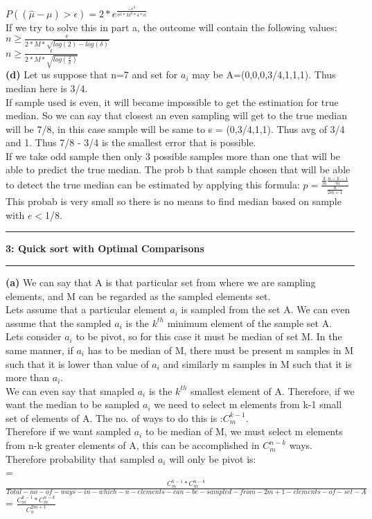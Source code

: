 \documentclass[11pt]{article}
\newcommand\question[2]{\vspace{.25in}\hrule\textbf{#1: #2}\vspace{.5em}\hrule\vspace{.10in}}
\renewcommand\part[1]{\vspace{.10in}\textbf{(#1)}}
\begin{document}
$P((\hat{\mu} - \mu) > \epsilon) = 2 * e^ {\frac{-\epsilon ^ 2}{\sigma ^ 2 * M^2  * 4 * n}}$\\
If we try to solve this in part a, the outcome will contain the following values:\\
$n \geq \frac{\epsilon}{2 * M *\sqrt{log(2)- log(\delta)}}$\\
$n \geq \frac{\epsilon}{2 * M *\sqrt{log(\frac{2}{\delta})}}$ \\

\part{d}
Let us suppose that n=7 and set for $a_i$ may be A=(0,0,0,3/4,1,1,1). Thus median here is 3/4.\\
If sample used is even, it will became impossible to get the estimation for true median. So we can say that closest an even sampling will get to the true median will be 7/8, in this case sample will be same to s = (0,3/4,1,1). Thus avg of 3/4 and 1. Thus 7/8 - 3/4 is the smallest error that is possible.\\
If we take odd sample then only 3 possible samples more than one that will be able to predict the true median. The prob b that sample chosen that will be able to detect the true median can be estimated by applying this formula:
$p=\frac{\frac{k}{m}\frac{n-k-1}{m}}{\frac{n}{2m +1}}$
This probab is very small so there is no means to find median based on sample with $e<$1/8. 

\question{3}{Quick sort with Optimal Comparisons}
\part{a} We can say that A is that particular set from where we are sampling elements, and M can be regarded as the sampled elements set.\\ Lets assume that a particular element $a_i$ is sampled from the set A. We can even assume that the sampled $a_i$ is the $k^{th}$ minimum element of the sample set A.\\
Lets consider $a_i$ to be pivot, so for this case it must be median of set M. In the same manner, if $a_i$ has to be median of M, there must be present m samples in M such that it is lower than value of $a_i$ and similarly m samples in M such that it is more than $a_i$.\\
We can even say that smapled $a_i$ is the $k^{th}$ smallest element of A. Therefore, if we want the median to be sampled $a_i$ we need to select m elements from k-1 small set of elements of A. The no. of ways to do this is :$C^{k-1}_{m}$.\\
Therefore if we want sampled $a_i$ to be median of M, we must select m elements from n-k greater elements of A, this can be accomplished in $C^{n-k}_{m}$ ways.\\
Therefore probability that sampled $a_i $ will only be pivot is:\\
= $\frac{C^{k-1}_{m} * C^{n-k}_{m}}
{Total-no-of-ways-in-which-n-elements-can-be-sampled-from-2m + 1-elements-of-set-A}$\\
= $\frac{C^{k-1}_{m} * C^{n-k}_{m}}{C^{2m + 1}_n}$
\end{document}

